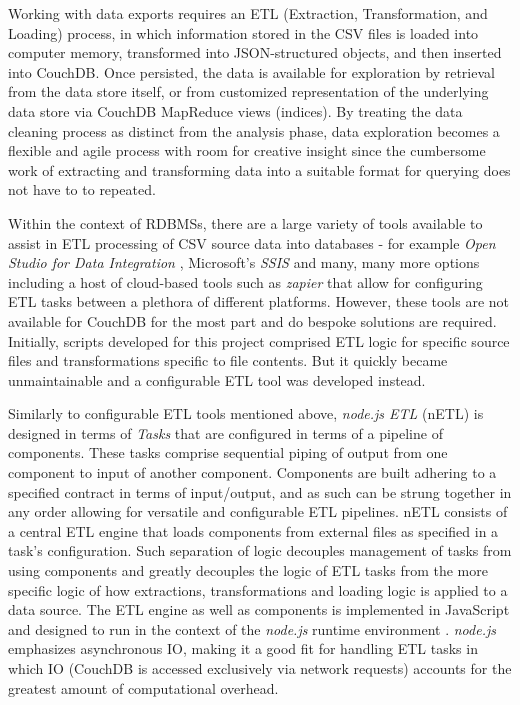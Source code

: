 Working with data exports requires an ETL (Extraction, Transformation, and Loading) process, in which information stored in the CSV files is loaded into computer memory, transformed into JSON-structured objects, and then inserted into CouchDB. Once persisted, the data is available for exploration by retrieval from the data store itself, or from customized representation of the underlying data store via CouchDB MapReduce views (indices). By treating the data cleaning process as distinct from the analysis phase, data exploration becomes a flexible and agile process with room for creative insight since the cumbersome work of extracting and transforming data into a suitable format for querying does not have to to repeated.

Within the context of RDBMSs, there are a large variety of tools available to assist in ETL processing of CSV source data into databases - for example \textit{Open Studio for Data Integration} \cite{talend}, Microsoft's \textit{SSIS} \cite{ssis} and many, many more options including a host of cloud-based tools such as \textit{zapier} \cite{zapier} that allow for configuring ETL tasks between a plethora of different platforms. However, these tools are not available for CouchDB for the most part and do bespoke solutions are required. Initially, scripts developed for this project comprised ETL logic for specific source files and transformations specific to file contents. But it quickly became unmaintainable and a configurable ETL tool was developed instead.

Similarly to configurable ETL tools mentioned above, \textit{node.js ETL} (nETL) is designed in terms of \textit{Tasks} that are configured in terms of a pipeline of components. These tasks comprise sequential piping of output from one component to input of another component. Components are built adhering to a specified contract in terms of input/output, and as such can be strung together in any order allowing for versatile and configurable ETL pipelines. nETL consists of a central ETL engine that loads components from external files as specified in a task's configuration. Such separation of logic decouples management of tasks from using components and greatly decouples the logic of ETL tasks from the more specific logic of how extractions, transformations and loading logic is applied to a data source. The ETL engine as well as components is implemented in JavaScript and designed to run in the context of the \textit{node.js} runtime environment \cite{nodejs}. \textit{node.js} emphasizes asynchronous IO, making it a good fit for handling ETL tasks in which IO (CouchDB is accessed exclusively via network requests) accounts for the greatest amount of computational overhead.